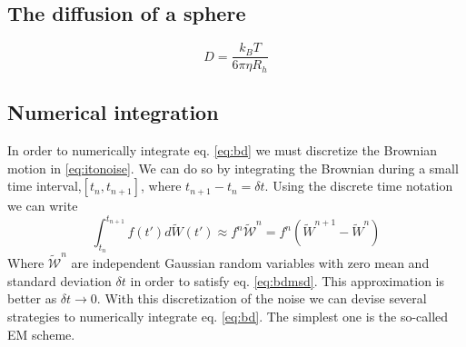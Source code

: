 \documentclass[ twoside,openright,titlepage,numbers=noenddot,%
headinclude,footinclude,cleardoublepage=empty,abstract=on,
BCOR=5mm,paper=a4,fontsize=11pt, dvipsnames
]{scrreprt}
\newcommand{\dt}{\delta t}
\newcommand{\kT}{k_B T}
\newcommand{\noise}{\widetilde{W}}
\begin{document}
\subsection{The diffusion of a sphere}
\begin{equation}
  D = \frac{\kT}{6\pi\eta R_h}
\end{equation}
\subsection{Numerical integration}
In order to numerically integrate eq. \eqref{eq:bd} we must discretize the Brownian motion in \eqref{eq:itonoise}. We can do so by integrating the Brownian during a small time interval,$[t_n, t_{n+1}]$, where $t_{n+1}-t_{n} = \dt$. Using the discrete time notation we can write
\begin{equation}
  \label{eq:itonoise2}
  \int_{t_n}^{t_{n+1}}f(t')d\noise(t') \approx f^n \mathcal{\noise}^n = f^n \left(\noise^{n+1} - \noise^n\right)
\end{equation}
Where $\mathcal{\noise}^n$ are independent Gaussian random variables with zero mean and standard deviation $\dt$ in order to satisfy eq. \eqref{eq:bdmsd}. This approximation is better as $\dt \rightarrow 0$.
With this discretization of the noise we can devise several strategies to numerically integrate eq. \eqref{eq:bd}. The simplest one is the so-called \gls{EM} scheme\cite{Desmond2001}.
\end{document}
